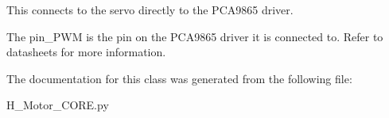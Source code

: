 This connects to the servo directly to the P\+C\+A9865 driver. 

The pin\+\_\+\+P\+W\+M is the pin on the P\+C\+A9865 driver it is connected to. Refer to datasheets for more information. 

The documentation for this class was generated from the following file\+:\begin{DoxyCompactItemize}
\item 
H\+\_\+\+Motor\+\_\+\+C\+O\+R\+E.\+py\end{DoxyCompactItemize}
